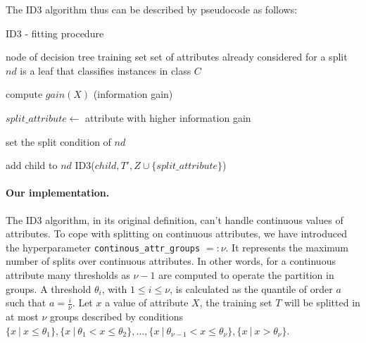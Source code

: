 \documentclass[12pt]{article}
\newcommand{\Desc}[2]{\State \makebox[2em][l]{#1}#2}
\begin{document}
\newpage
The ID3 algorithm thus can be described by pseudocode as follows:

\begin{algorithm}
\caption{ID3 - fitting procedure}\label{alg:id3}
\begin{algorithmic}
\Input
\Desc{$nd$}{node of decision tree}
\Desc{$T$}{training set}
\Desc{$Z$}{set of attributes already considered for a split}
\EndInput
\\
    \State $nd$ is a leaf that classifies instances in class $C$
    \State \Return
\EndIf

    \State \Return
\EndIf

    \State compute $gain(X)$ (information gain)
\EndFor

\State $split\_attribute \gets$ attribute with higher information gain

\State set the split condition of $nd$

    \State add child to $nd$
    \State ID3($child, T', Z \cup \{split\_attribute\}$)
\EndFor

\end{algorithmic}
\end{algorithm}

\paragraph{Our implementation.}

The ID3 algorithm, in its original definition, can't handle continuous values of attributes.
To cope with splitting on continuous attributes, we have introduced the hyperparameter \texttt{continous\_attr\_groups} $=: \nu$. It represents the maximum number of splits over continuous attributes. In other words, for a continuous attribute many thresholds as $\nu-1$ are computed to operate the partition in groups.
A threshold $\theta_i$, with $1 \le i \le \nu$, is calculated as the quantile of order $a$ such that 
$a = \frac i \nu$.
Let $x$ a value of attribute $X$, the training set $T$ will be splitted in at most $\nu$ groups described by conditions $\{ x\ |\ x \le \theta_1 \}, \{x\ |\ \theta_1 < x \le \theta_2\}, \dots, \{x\ |\ \theta_{\nu-1} < x \le \theta_{\nu}\}, \{x\ |\  x >\theta_{\nu}\}$.
\end{document}
